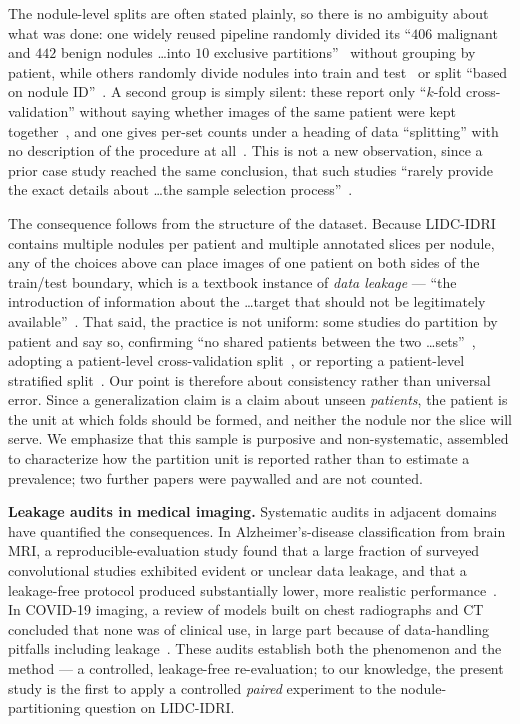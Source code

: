 \documentclass{ieeeaccess}
\newcommand{\vcite}[1]{\cite{#1}}
\begin{document}
The nodule-level splits are often stated plainly, so there is no ambiguity about what was
done: one widely reused pipeline randomly divided its ``$406$ malignant and $442$ benign nodules
\ldots into $10$ exclusive partitions''~\vcite{alshabi2019gated} without grouping by patient, while
others randomly divide nodules into train and test~\vcite{contrastdiag2024} or split ``based on
nodule ID''~\vcite{lmlcc2025}. A second group is simply silent: these report only ``$k$-fold
cross-validation'' without saying whether images of the same patient were kept together~\vcite{alshabi2019lg,procan2021,xiao2020ens}, and one gives per-set counts under a heading of data
``splitting'' with no description of the procedure at all~\vcite{attnpyramid2024}. This is not a new
observation, since a prior case study reached the same conclusion, that such studies ``rarely provide
the exact details about \ldots the sample selection process''~\vcite{pitfalls2021}.

The consequence follows from the structure of the dataset. Because LIDC-IDRI contains multiple
nodules per patient and multiple annotated slices per nodule, any of the choices above can place
images of one patient on both sides of the train/test boundary, which is a textbook instance of
\emph{data leakage} --- ``the introduction of information about the \ldots target that should not be
legitimately available''~\vcite{kaufman2012}. That said, the practice is not uniform: some studies do
partition by patient and say so, confirming ``no shared patients between the two \ldots sets''~\vcite{mcn2020}, adopting a patient-level cross-validation split~\vcite{cmixnet2019}, or reporting a
patient-level stratified split~\vcite{mase2025}. Our
point is therefore about consistency rather than universal error. Since a generalization claim is a
claim about unseen \emph{patients}, the patient is the unit at which folds should be formed, and
neither the nodule nor the slice will serve. We emphasize that this sample is purposive and
non-systematic, assembled to characterize how the partition unit is reported rather than to estimate
a prevalence; two further papers were paywalled and are not counted.

\textbf{Leakage audits in medical imaging.} Systematic audits in adjacent domains have quantified the
consequences. In Alzheimer's-disease classification from brain MRI, a reproducible-evaluation study
found that a large fraction of surveyed convolutional studies exhibited evident or unclear data
leakage, and that a leakage-free protocol produced substantially lower, more realistic performance~\vcite{wen2020}. In COVID-19 imaging, a review of models built on chest radiographs and CT concluded
that none was of clinical use, in large part because of data-handling pitfalls including leakage~\vcite{roberts2021}. These audits establish both the phenomenon and the method --- a controlled,
leakage-free re-evaluation; to our knowledge, the present study is the first to apply a controlled
\emph{paired} experiment to the nodule-partitioning question on LIDC-IDRI.
\end{document}
